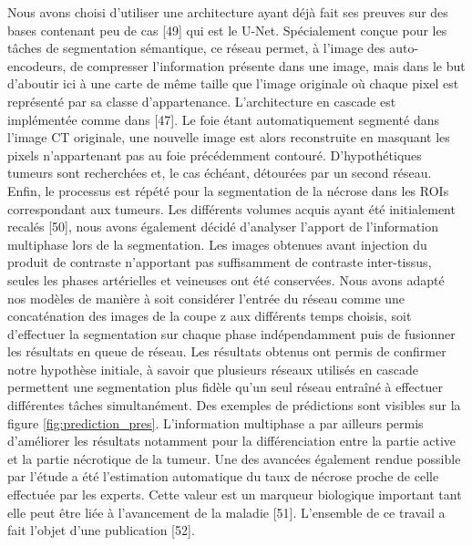\documentclass[]{memoir}
\begin{document}
Nous avons choisi d’utiliser une architecture ayant déjà fait ses preuves sur des bases contenant peu de cas [49] qui est le U-Net.
Spécialement conçue pour les tâches de segmentation sémantique, ce réseau permet, à l’image des auto-encodeurs, de compresser l’information présente dans une image, mais dans le but d’aboutir ici à une carte de même taille que l’image originale où chaque pixel est représenté par sa classe d’appartenance.
L’architecture en cascade est implémentée comme dans [47]. Le foie étant automatiquement segmenté dans l’image CT originale, une nouvelle image est alors reconstruite en masquant les pixels n’appartenant pas au foie précédemment contouré. D’hypothétiques tumeurs sont recherchées et, le cas échéant, détourées par un second réseau. Enfin, le processus est répété pour la segmentation de la nécrose dans les ROIs correspondant aux tumeurs.
Les différents volumes acquis ayant été initialement recalés [50], nous avons également décidé d’analyser l’apport de l’information multiphase lors de la segmentation. Les images obtenues avant injection du produit de contraste n’apportant pas suffisamment de contraste inter-tissus, seules les phases artérielles et veineuses ont été conservées.
Nous avons adapté nos modèles de manière à soit considérer l’entrée du réseau comme une concaténation des images de la coupe z aux différents temps choisis, soit d’effectuer la segmentation sur chaque phase indépendamment puis de fusionner les résultats en queue de réseau.
Les résultats obtenus ont permis de confirmer notre hypothèse initiale, à savoir que plusieurs réseaux utilisés en cascade permettent une segmentation plus fidèle qu’un seul réseau entraîné à effectuer différentes tâches simultanément.
Des exemples de prédictions sont visibles sur la figure \ref{fig:prediction_pres}. L’information multiphase a par ailleurs permis d’améliorer les résultats notamment pour la différenciation entre la partie active et la partie nécrotique de la tumeur. Une des avancées également rendue possible par l’étude a été l’estimation automatique du taux de nécrose proche de celle effectuée par les experts. Cette valeur est un marqueur biologique important tant elle peut être liée à l’avancement de la maladie [51].
L’ensemble de ce travail a fait l’objet d’une publication [52].
\end{document}
